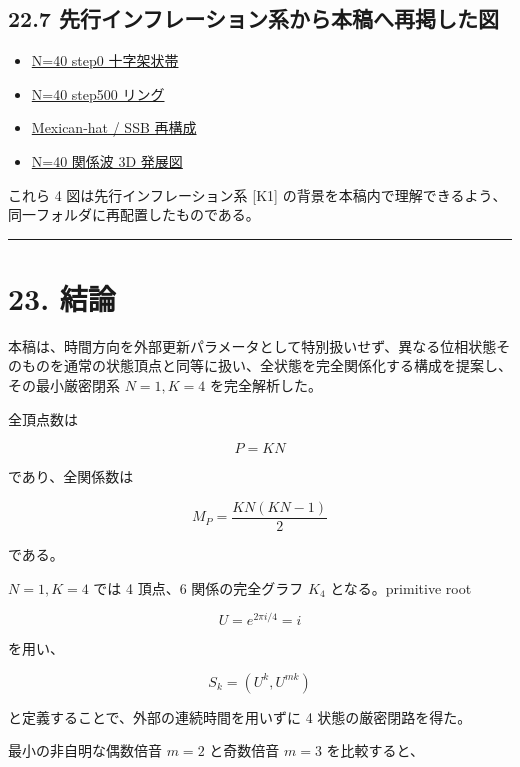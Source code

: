 \documentclass[
  a4paper,
]{ltjsarticle}
\providecommand{\tightlist}{%
  \setlength{\itemsep}{0pt}\setlength{\parskip}{0pt}}
\begin{document}
\subsection{22.7
先行インフレーション系から本稿へ再掲した図}\label{ux5148ux884cux30a4ux30f3ux30d5ux30ecux30fcux30b7ux30e7ux30f3ux7cfbux304bux3089ux672cux7a3fux3078ux518dux63b2ux3057ux305fux56f3}

\begin{itemize}
\tightlist
\item
  \href{figs/inflation_N40_phase_step0_cross_20260915.png}{N=40 step0
  十字架状帯}
\item
  \href{figs/inflation_N40_phase_step500_ring_20260915.png}{N=40 step500
  リング}
\item
  \href{figs/inflation_mexican_hat_SSB_reconstruction_20260915.png}{Mexican-hat
  / SSB 再構成}
\item
  \href{figs/inflation_N40_relation_wave_3D_step500_20260915.png}{N=40
  関係波 3D 発展図}
\end{itemize}

これら 4 図は先行インフレーション系 {[}K1{]}
の背景を本稿内で理解できるよう、同一フォルダに再配置したものである。

\begin{center}\rule{0.5\linewidth}{0.5pt}\end{center}

\section{23. 結論}\label{ux7d50ux8ad6}

本稿は、時間方向を外部更新パラメータとして特別扱いせず、異なる位相状態そのものを通常の状態頂点と同等に扱い、全状態を完全関係化する構成を提案し、その最小厳密閉系
\(N=1, K=4\) を完全解析した。

全頂点数は

\[
P=KN
\]

であり、全関係数は

\[
M_P
=
\frac{KN(KN-1)}2
\]

である。

\(N=1, K=4\) では 4 頂点、6 関係の完全グラフ \(K_4\) となる。primitive
root

\[
U=e^{2\pi i/4}=i
\]

を用い、

\[
S_k=(U^k,U^{mk})
\]

と定義することで、外部の連続時間を用いずに 4 状態の厳密閉路を得た。

最小の非自明な偶数倍音 \(m=2\) と奇数倍音 \(m=3\) を比較すると、
\end{document}
